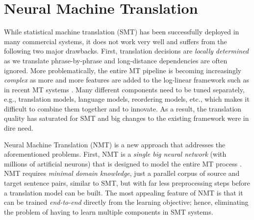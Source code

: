 \section{Neural Machine Translation}
While statistical machine translation (SMT) has been successfully deployed in many
commercial systems, it does not work very well and suffers from the following
two major drawbacks.
First, translation decisions are {\it locally determined} as we translate
phrase-by-phrase and long-distance dependencies are often ignored. 
More problematically, the entire MT pipeline is becoming increasingly {\it
complex} as more and more features are added to the log-linear framework
such as in recent MT systems \cite{galley08,chiang09,green13}. Many different
components need to be tuned
separately, e.g., translation models, language models, reordering models, etc.,
which makes it difficult to combine them together and to innovate. As a result,
the translation quality has saturated for SMT and big changes to the
existing framework were in dire need.

Neural Machine Translation (NMT) is a new approach 
that addresses the aforementioned problems. First, NMT is a {\it single big neural
network} (with millions of artificial neurons) that is designed to model the
entire MT process 
\cite{kal13,sutskever14,cho14}. NMT requires {\it minimal domain knowledge}, just a
parallel corpus of source and target sentence pairs, similar to SMT, but with far
less preprocessing steps before a translation model can be built.
The most appealing feature of NMT is that it can be
trained {\it end-to-end} directly from the learning objective; hence, eliminating the
problem of having to learn multiple components in SMT systems. 

